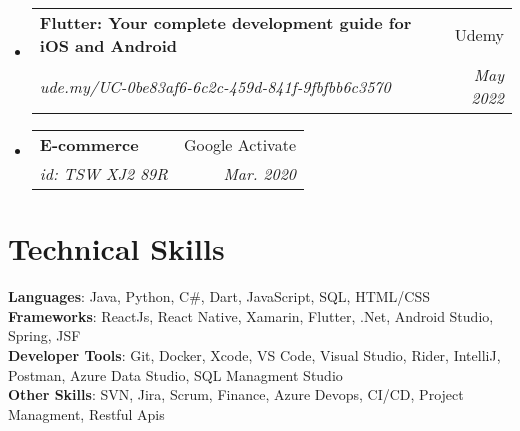 \documentclass[letterpaper,11pt]{article}
\makeatletter
\newcommand{\resumeSubheading}[4]{
  \vspace{-2pt}\item
    \begin{tabular*}{0.97\textwidth}[t]{l@{\extracolsep{\fill}}r}
      \textbf{#1} & #2 \\
      \textit{\small#3} & \textit{\small #4} \\
    \end{tabular*}\vspace{-7pt}
}
\newcommand{\resumeSubHeadingListStart}{\begin{itemize}[leftmargin=0.15in, label={}]}
\newcommand{\resumeSubHeadingListEnd}{\end{itemize}}
\makeatother
\begin{document}
  \resumeSubHeadingListStart
    \resumeSubheading
      {Flutter: Your complete development guide for iOS and Android }{Udemy}
      {ude.my/UC-0be83af6-6c2c-459d-841f-9fbfbb6c3570}{May 2022}
  \resumeSubHeadingListEnd

  \resumeSubHeadingListStart
    \resumeSubheading
      {E-commerce}{Google Activate}
      {id: TSW XJ2 89R}{Mar. 2020}
  \resumeSubHeadingListEnd


%

\section{Technical Skills}
 \begin{itemize}[leftmargin=0.15in, label={}]
    \small{\item{
     \textbf{Languages}{: Java, Python, C\#, Dart, JavaScript, SQL, HTML/CSS} \\
     \textbf{Frameworks}{: ReactJs, React Native, Xamarin, Flutter, .Net, Android Studio, Spring, JSF} \\
     \textbf{Developer Tools}{: Git, Docker, Xcode, VS Code, Visual Studio, Rider, IntelliJ, Postman, Azure Data Studio, SQL Managment Studio} \\
     \textbf{Other Skills}{: SVN, Jira, Scrum, Finance, Azure Devops, CI/CD, Project Managment, Restful Apis}
    }}
 \end{itemize}


\end{document}
